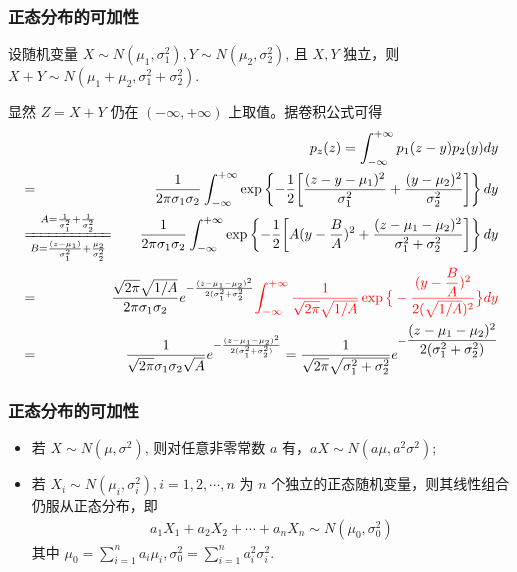  \begin{frame}
 	\frametitle{正态分布的可加性}
 	\begin{exam}
 		设随机变量 $X\sim N (\mu_1,\sigma_1^2), Y\sim N (\mu_2,\sigma_2^2)$, 且 $X,Y$ 独立，则 $X+Y\sim N (\mu_1+\mu_2,\sigma_1^2+\sigma_2^2)$.
 	\end{exam}

 	\pause \zheng 显然 $Z=X+Y$ 仍在 $(-\infty,+\infty)$ 上取值。据卷积公式可得
 	{\small\begin{eqnarray*}
 			&&  \hspace{-2.4cm} p_z(z)=\int_{-\infty}^{+\infty}p_1(z-y)p_2(y)dy\\
 			&=&\dfrac{1}{2\pi\sigma_1\sigma_2}\int_{-\infty}^{+\infty}\exp\left\{-\dfrac{1}{2}\bigg[\dfrac{(z-y-\mu_1)^2}{\sigma_1^2}+\dfrac{(y-\mu_2)^2}{\sigma_2^2}\bigg]\right\}dy\\
 			&\xlongequal[B=\frac{(z-\mu_1)}{\sigma_1^2}+\frac{\mu_2}{\sigma_2^2}]{A=\frac{1}{\sigma_1^2}+\frac{1}{\sigma_2^2}}&\dfrac{1}{2\pi\sigma_1\sigma_2}\int_{-\infty}^{+\infty}\exp\left\{-\dfrac{1}{2}\bigg[A(y-\dfrac{B}{A})^2+\dfrac{(z-\mu_1-\mu_2)^2}{\sigma_1^2+\sigma_2^2}\bigg]\right\}dy\\
 			&=&\hspace{-0.5cm}\dfrac{\sqrt{2\pi}\sqrt{1/A}}{2\pi\sigma_1\sigma_2}e^{-\frac{(z-\mu_1-\mu_2)^2}{2(\sigma_1^2+\sigma_2^2}}\textcolor{red}{\int_{-\infty}^{+\infty}\frac{1}{\sqrt{2\pi}\sqrt{1/A}}\exp\big\{-\dfrac{(y-\dfrac{B}{A})^2}{2(\sqrt{1/A})^2}\big\}dy}\\
 			&=&\dfrac{1}{\sqrt{2\pi}\sigma_1\sigma_2\sqrt{A}}e^{-\frac{(z-\mu_1-\mu_2)^2}{2(\sigma_1^2+\sigma_2^2)}}=\dfrac{1}{\sqrt{2\pi}\sqrt{\sigma_1^2+\sigma_2^2}}e^{-\dfrac{(z-\mu_1-\mu_2)^2}{2(\sigma_1^2+\sigma_2^2)}}
 	\end{eqnarray*}}

 \end{frame}
 \begin{frame}
 	\frametitle{正态分布的可加性}
 	\begin{itemize}[<+-|alert@+>]
 		\item 若 $X\sim N (\mu,\sigma^2)$, 则对任意非零常数 $a$ 有，$aX\sim N (a\mu,a^2\sigma^2)$;
 		\item 若 $X_i\sim N (\mu_i,\sigma_i^2), i=1,2,\cdots, n$ 为 $n$ 个独立的正态随机变量，则其线性组合仍服从正态分布，即
 		\begin{eqnarray*}
 			a_1X_1+a_2X_2+\cdots+a_nX_n\sim N(\mu_0,\sigma_0^2)
 		\end{eqnarray*}
 		其中 $\mu_0=\sum_{i=1}^na_i\mu_i, \sigma_0^2=\sum_{i=1}^na_i^2\sigma_i^2$.


 	\end{itemize}
 \end{frame}

